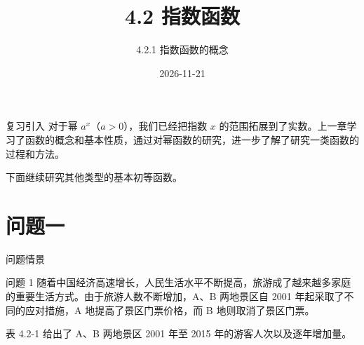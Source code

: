 \documentclass[aspectratio=169,11pt,t,fleqn]{ctexbeamer}
\title[指数函数的概念]{4.2 指数函数}
\subtitle{4.2.1 指数函数的概念}
\author[好好学习，努力向上]{}
\date{2026-11-21}
\begin{document}
\begin{frame}
  \titlepage
\end{frame}

\begin{frame}{复习引入}
  对于幂 $a^x$（$a>0$），我们已经把指数 $x$ 的范围拓展到了实数。上一章学习了函数的概念和基本性质，通过对幂函数的研究，进一步了解了研究一类函数的过程和方法。

  \vspace{1em}
  下面继续研究其他类型的基本初等函数。
\end{frame}

\section{问题一}
\begin{frame}{问题情景}
  \begin{block}{问题 1}
    随着中国经济高速增长，人民生活水平不断提高，旅游成了越来越多家庭的重要生活方式。由于旅游人数不断增加，A、B 两地景区自 2001 年起采取了不同的应对措施，A 地提高了景区门票价格，而 B 地则取消了景区门票。

    \vspace{0.5em}
    表 4.2-1 给出了 A、B 两地景区 2001 年至 2015 年的游客人次以及逐年增加量。
  \end{block}
\end{frame}
\end{document}
